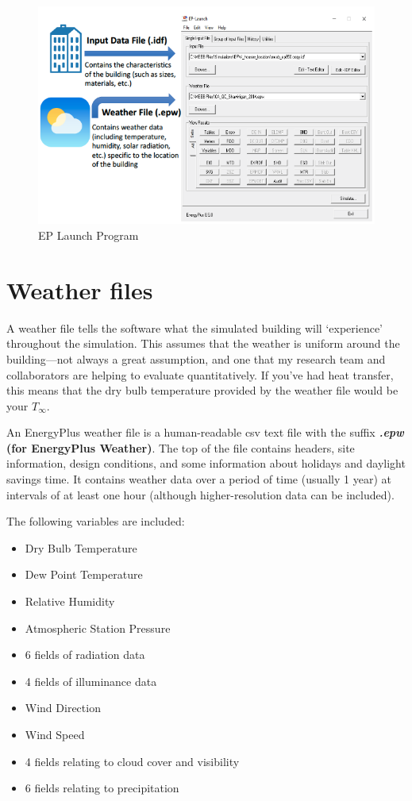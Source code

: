 \documentclass[10pt]{article}
\begin{document}
            \begin{figure}[h]
            \centering
            \includegraphics[width=5in]{extras08/EPinterface.png}
            \caption{EP Launch Program \cite{Bianchi-dissertation}}
            \label{EPlaunch}
            \end{figure}




\section{Weather files}

A weather file tells the software what the simulated building will `experience' throughout the simulation. This assumes that the weather is uniform around the building---not always a great assumption, and one that my research team and collaborators are helping to evaluate quantitatively. If you've had heat transfer, this means that the dry bulb temperature provided by the weather file would be your $T_\infty$. 

An EnergyPlus weather file is a human-readable csv text file with the suffix \textbf{\textit{.epw} (for EnergyPlus Weather)}. The top of the file contains headers, site information, design conditions, and some information about holidays and daylight savings time. It contains weather data over a period of time (usually 1 year) at intervals of at least one hour (although higher-resolution data can be included). 


The following variables are included:
\begin{itemize}
    \item Dry Bulb Temperature
    \item Dew Point Temperature
    \item  Relative Humidity
    \item  Atmospheric Station Pressure
    \item 6 fields of radiation data
    \item 4 fields of illuminance data
    \item Wind Direction
    \item  Wind Speed
    \item 4 fields relating to cloud cover and visibility
    \item 6 fields relating to precipitation
\end{itemize}
\end{document}
